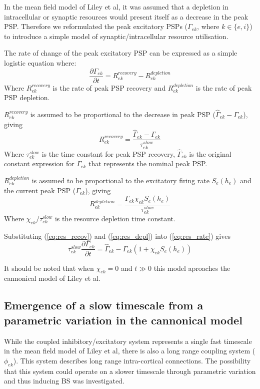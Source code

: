 \documentclass[a4paper,12pt]{article}
\begin{document}
In the mean field model of Liley et al, it was assumed that a depletion in intracellular or synaptic resources would present itself as a decrease in the peak PSP. Therefore we reformulated the peak excitatory PSPs ($\Gamma_{ek}$, where $k \in \{e, i\}$) to
introduce a simple model of synaptic/intracellular resource utilisation.

The rate of change of the peak excitatory PSP can be expressed as a simple logistic equation where:
\begin{equation}
\label{eq:res_rate}
\frac{\partial{\Gamma_{ek}}}{\partial{t}} = R_{ek}^{recovery} - R_{ek}^{depletion}
\end{equation}
\noindent
Where $R_{ek}^{recovery}$ is the rate of peak PSP recovery and $R_{ek}^{depletion}$ is the rate of peak PSP depletion.

$R_{ek}^{recovery}$ is assumed to be proportional to the decrease in peak PSP ($\hat{\Gamma}_{ek} - {\Gamma}_{ek}$), giving
\begin{equation}
\label{eq:res_recov}
R_{ek}^{recovery}= \frac{\hat{\Gamma}_{ek} - {\Gamma}_{ek}}{\tau_{ek}^{slow}}
\end{equation}
\noindent
Where $\tau_{ek}^{slow}$ is the time constant for peak PSP recovery, $\hat{\Gamma}_{ek}$ is the original constant expression for $\Gamma_{ek}$ that represents the nominal peak PSP.

$R_{ek}^{depletion}$ is assumed to be proportional to the excitatory firing rate $S_e(h_e)$ and the current peak PSP ($\Gamma_{ek}$), giving
\begin{equation}
\label{eq:res_depl}
R_{ek}^{depletion}= \frac{\Gamma_{ek} \chi_{ek}S_e(h_e)}{\tau_{ek}^{slow}}
\end{equation}
\noindent
Where $\chi_{ek}/\tau_{ek}^{slow}$ is the resource depletion time constant.

Substituting (\ref{eq:res_recov}) and (\ref{eq:res_depl}) into (\ref{eq:res_rate}) gives
\begin{equation} \label{eq:Gamma_ek}
{\tau^{slow}_{ek}} \frac{\partial{\Gamma_{ek}}}{\partial{t}} = \hat{\Gamma}_{ek} - \Gamma_{ek}(1 + \chi_{ek} S_e(h_e))
\end{equation}

It should be noted that when $\chi_{ek}=0$ and $t \gg 0$ this model aproaches the cannonical model of Liley et al.

\subsection{Emergence of a slow timescale from a parametric variation in the cannonical model}
While the coupled inhibitory/excitatory system represents a single fast timescale in the mean field model of Liley et al, there is also a long range coupling system ($\phi_{ek}$). This system describes long range intra-cortical connections. The possibility that this system could operate on a slower timescale through parametric variation and thus inducing BS was investigated.
\end{document}
